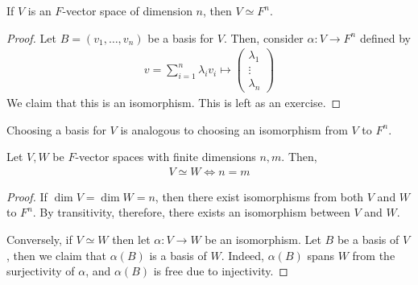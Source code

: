     \begin{theorem}
        If $V$ is an $F$-vector space of dimension $n$, then $V \simeq F^n$.
    \end{theorem}
    \begin{proof}
        Let $B = (v_1, \dots, v_n)$ be a basis for $V$.
        Then, consider $\alpha \colon V \to F^n$ defined by
        \begin{align*}
            v = \sum_{i=1}^n \lambda_i v_i \mapsto \begin{pmatrix}\lambda_1 \\ \vdots \\ \lambda_n \end{pmatrix}
        \end{align*}
        We claim that this is an isomorphism.
        This is left as an exercise.
    \end{proof}
    \begin{remark}
        Choosing a basis for $V$ is analogous to choosing an isomorphism from $V$ to $F^n$.
    \end{remark}
    \begin{theorem}
        Let $V, W$ be $F$-vector spaces with finite dimensions $n, m$.
        Then,
        \begin{align*}
            V \simeq W \iff n = m
        \end{align*}
    \end{theorem}
    \begin{proof}
        If $\dim V = \dim W = n$, then there exist isomorphisms from both $V$ and $W$ to $F^n$.
        By transitivity, therefore, there exists an isomorphism between $V$ and $W$.

        Conversely, if $V \simeq W$ then let $\alpha \colon V \to W$ be an isomorphism.
        Let $B$ be a basis of $V$, then we claim that $\alpha(B)$ is a basis of $W$.
        Indeed, $\alpha(B)$ spans $W$ from the surjectivity of $\alpha$, and $\alpha(B)$ is free due to injectivity.
    \end{proof}

